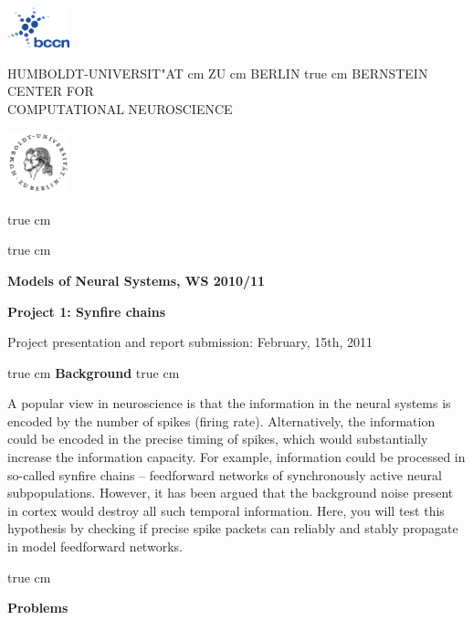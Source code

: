 \documentclass[12pt]{article}
\begin{document}
\parbox{2cm}{
\includegraphics[width=1.8cm]{../bccnlogo.pdf}
}
\parbox{11cm}{
\begin{center}
\large HUMBOLDT-UNIVERSIT"AT  cm ZU  cm BERLIN
 true cm
\mgross BERNSTEIN CENTER FOR\\ COMPUTATIONAL NEUROSCIENCE
\end{center}
}
\parbox{2cm}
{
\hfill
\includegraphics[width=1.8cm]{../hublogo.pdf}
}

 true cm



 true cm
\centerline{\bf Models of Neural Systems, WS 2010/11}
\centerline{\bf Project 1: Synfire chains}
\centerline{Project presentation and report submission: February,
15th, 2011}

 true cm
{\bf Background}
 true cm

 A popular view in neuroscience is that the information in
 the neural systems is encoded by the number of spikes (firing rate).
 Alternatively, the information could be encoded in the precise timing
 of spikes, which would substantially increase the information capacity.
 For example, information could be processed in so-called synfire
 chains -- feedforward networks of synchronously active
 neural subpopulations. However, it has been argued that the
 background noise present in cortex would destroy all such
 temporal information. Here, you will test this hypothesis by checking if precise
 spike packets can reliably and stably propagate in model feedforward
 networks.

 true cm

{\bf Problems}
\end{document}
